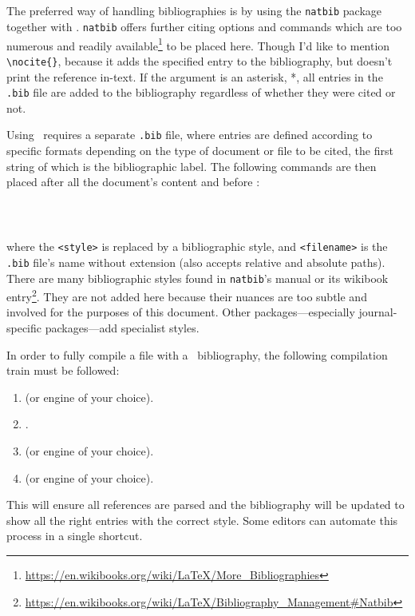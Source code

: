 \subsection{\BibTeX}\label{sb:bib}
%
The preferred way of handling bibliographies is by using the
\verb|natbib| package together with \BibTeX.  \verb|natbib| offers
further citing options and commands which are too numerous and readily
available\footnote{\url{https://en.wikibooks.org/wiki/LaTeX/More_Bibliographies}}
to be placed here.  Though I'd like to mention \verb|\nocite{}|,
because it adds the specified entry to the bibliography, but doesn't
print the reference in-text.  If the argument is an asterisk, *, all
entries in the \verb|.bib| file are added to the bibliography
regardless of whether they were cited or not.

Using \BibTeX~requires a separate \verb|.bib| file, where entries are
defined according to specific formats depending on the type of
document or file to be cited, the first string of which is the
bibliographic label.  The following commands are then placed after all
the document's content and before \verb||:
\begin{verbatim}
    
    
\end{verbatim}
where the \verb|<style>| is replaced by a bibliographic style, and
\verb|<filename>| is the \verb|.bib| file's name without extension
(also accepts relative and absolute paths).  There are many
bibliographic styles found in \verb|natbib|'s manual or its wikibook
entry\footnote{\url{https://en.wikibooks.org/wiki/LaTeX/Bibliography_Management\#Natbib}}.
They are not added here because their nuances are too subtle and
involved for the purposes of this document.  Other
packages---especially journal-specific packages---add specialist
styles.

In order to fully compile a file with a \BibTeX~bibliography, the
following compilation train must be followed:
\begin{enumerate}
    \item \XeLaTeX (or engine of your choice).
    \item \BibTeX.
    \item \XeLaTeX (or engine of your choice).
    \item \XeLaTeX (or engine of your choice).
\end{enumerate}
This will ensure all references are parsed and the bibliography will
be updated to show all the right entries with the correct style.  Some
editors can automate this process in a single shortcut.
%
